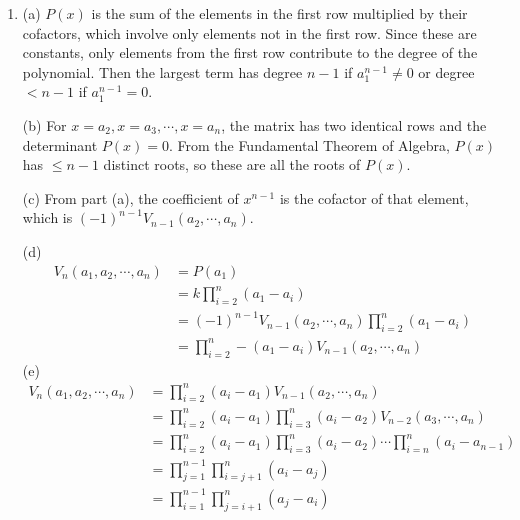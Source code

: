 \documentclass[a4paper, 12pt]{article}
\begin{document}
\begin{enumerate}
		\item (a) $P(x)$ is the sum of the elements in the first row multiplied by their cofactors, which involve only elements not in the first row. Since these are constants, only elements from the first row contribute to the degree of the polynomial. Then the largest term has degree $n - 1$ if $a_1^{n - 1} \neq 0$ or degree $< n - 1$ if $a_1^{n - 1} = 0$. \par
		(b) For $x = a_2, x = a_3, \cdots, x = a_n$, the matrix has two identical rows and the determinant $P(x) = 0$. From the Fundamental Theorem of Algebra, $P(x)$ has $\leq n - 1$ distinct roots, so these are all the roots of $P(x)$. \par
		(c) From part (a), the coefficient of $x^{n - 1}$ is the cofactor of that element, which is $(-1)^{n - 1}V_{n - 1}(a_2, \cdots, a_n)$. \par
		(d)
		\begin{align*}
		V_n(a_1, a_2, \cdots, a_n) &= P(a_1) \\
		&= k\prod_{i = 2}^{n}(a_1 - a_i) \\
		&= (-1)^{n - 1}V_{n - 1}(a_2, \cdots, a_n)\prod_{i = 2}^{n}(a_1 - a_i) \\
		&= \prod_{i = 2}^{n}-(a_1 - a_i)V_{n - 1}(a_2, \cdots, a_n)
		\end{align*}
		(e)
		\begin{align*}
		V_n(a_1, a_2, \cdots, a_n) &= \prod_{i = 2}^{n}(a_i - a_1)V_{n - 1}(a_2, \cdots, a_n) \\
		&= \prod_{i = 2}^{n}(a_i - a_1)\prod_{i = 3}^{n}(a_i - a_2)V_{n - 2}(a_3, \cdots, a_n) \\
		&= \prod_{i = 2}^{n}(a_i - a_1)\prod_{i = 3}^{n}(a_i - a_2)\cdots\prod_{i = n}^{n}(a_i - a_{n - 1}) \\
		&= \prod_{j = 1}^{n - 1}\prod_{i = j + 1}^{n}(a_i - a_j) \\
		&= \prod_{i = 1}^{n - 1}\prod_{j = i + 1}^{n}(a_j - a_i)
		\end{align*}
	\end{enumerate}
\end{document}
